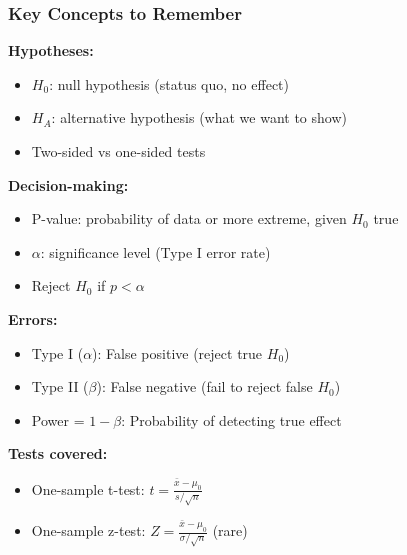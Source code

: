 \documentclass{beamer}
\begin{document}
\begin{frame}
\frametitle{Key Concepts to Remember}
\textbf{Hypotheses:}
\begin{itemize}
\item $H_0$: null hypothesis (status quo, no effect)
\item $H_A$: alternative hypothesis (what we want to show)
\item Two-sided vs one-sided tests
\end{itemize}

\vspace{0.1cm}
\textbf{Decision-making:}
\begin{itemize}
\item P-value: probability of data or more extreme, given $H_0$ true
\item $\alpha$: significance level (Type I error rate)
\item Reject $H_0$ if $p < \alpha$
\end{itemize}

\vspace{0.1cm}
\textbf{Errors:}
\begin{itemize}
\item Type I ($\alpha$): False positive (reject true $H_0$)
\item Type II ($\beta$): False negative (fail to reject false $H_0$)
\item Power = $1 - \beta$: Probability of detecting true effect
\end{itemize}

\vspace{0.1cm}
\textbf{Tests covered:}
\begin{itemize}
\item One-sample t-test: $t = \frac{\bar{x} - \mu_0}{s/\sqrt{n}}$
\item One-sample z-test: $Z = \frac{\bar{x} - \mu_0}{\sigma/\sqrt{n}}$ (rare)
\end{itemize}
\end{frame}
\end{document}
